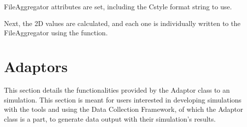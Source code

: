 \documentclass[letterpaper,10pt,english]{sphinxmanual}
\renewcommand{\sphinxcode}[1]{\texttt{\small{#1}}}
\begin{document}
FileAggregator attributes are set, including the C\sphinxhyphen{}style format string
to use.

\begin{sphinxVerbatim}[commandchars=\\\{\}]
 

 
\end{sphinxVerbatim}

Next, the 2\sphinxhyphen{}D values are calculated, and each one is individually
written to the FileAggregator using the \sphinxcode{} function.

\begin{sphinxVerbatim}[commandchars=\\\{\}]
   
   

           
          

         

   
\end{sphinxVerbatim}


\section{Adaptors}
\label{\detokenize{adaptor:adaptors}}\label{\detokenize{adaptor::doc}}
This section details the functionalities provided by the Adaptor
class to an  simulation. This section is meant for users
interested in developing simulations with the  tools and using
the Data Collection Framework, of which the Adaptor class is a
part, to generate data output with their simulation’s results.
\end{document}
